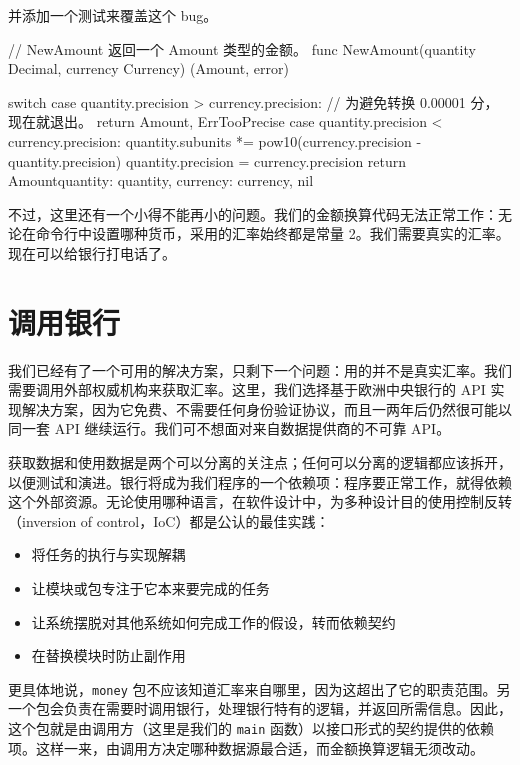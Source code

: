 并添加一个测试来覆盖这个 bug。

\begin{gocode}[title={代码清单 6.33 \texttt{amount.go}：修复 \texttt{NewAmount}}]
// NewAmount 返回一个 Amount 类型的金额。
func NewAmount(quantity Decimal, currency Currency) (Amount, error) {
    switch {
    case quantity.precision > currency.precision:
        // 为避免转换 0.00001 分，现在就退出。
        return Amount{}, ErrTooPrecise
    case quantity.precision < currency.precision:
        quantity.subunits *= pow10(currency.precision - quantity.precision)
        quantity.precision = currency.precision
    }
    return Amount{quantity: quantity, currency: currency}, nil

}
\end{gocode}

不过，这里还有一个小得不能再小的问题。我们的金额换算代码无法正常工作：无论在命令行中设置哪种货币，采用的汇率始终都是常量 2。我们需要真实的汇率。现在可以给银行打电话了。

\section{调用银行}

我们已经有了一个可用的解决方案，只剩下一个问题：用的并不是真实汇率。我们需要调用外部权威机构来获取汇率。这里，我们选择基于欧洲中央银行的 API 实现解决方案，因为它免费、不需要任何身份验证协议，而且一两年后仍然很可能以同一套 API 继续运行。我们可不想面对来自数据提供商的不可靠 API。

获取数据和使用数据是两个可以分离的关注点；任何可以分离的逻辑都应该拆开，以便测试和演进。银行将成为我们程序的一个依赖项：程序要正常工作，就得依赖这个外部资源。无论使用哪种语言，在软件设计中，为多种设计目的使用控制反转（inversion of control，IoC）都是公认的最佳实践：

\begin{itemize}
\item 将任务的执行与实现解耦
\item 让模块或包专注于它本来要完成的任务
\item 让系统摆脱对其他系统如何完成工作的假设，转而依赖契约
\item 在替换模块时防止副作用
\end{itemize}

更具体地说，\texttt{money} 包不应该知道汇率来自哪里，因为这超出了它的职责范围。另一个包会负责在需要时调用银行，处理银行特有的逻辑，并返回所需信息。因此，这个包就是由调用方（这里是我们的 \texttt{main} 函数）以接口形式的契约提供的依赖项。这样一来，由调用方决定哪种数据源最合适，而金额换算逻辑无须改动。

